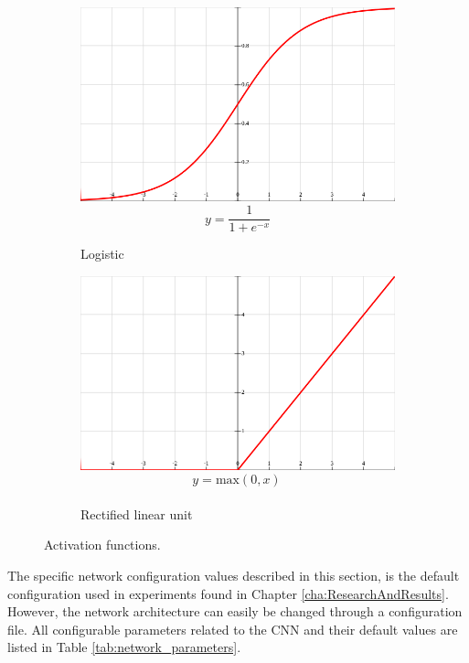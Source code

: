 \begin{figure}[h]
\begin{subfigure}{0.45\textwidth}
\includegraphics[width=\linewidth]{figs/sigmoid2.png}
$$ y = \frac{1}{1+ e^{-x}}$$
\caption{Logistic} \label{fig:activation_sigmoid}
\end{subfigure}
\hspace*{\fill} %
\begin{subfigure}{0.45\textwidth}
\includegraphics[width=\linewidth]{figs/relu2.png}
$$ y = \text{max}(0, x) \frac{}{}$$
\caption{Rectified linear unit} \label{fig:activation_relu}
\end{subfigure}
\hspace*{\fill} %
\caption{Activation functions.} \label{fig:activation_functions}
\end{figure}


The specific network configuration values described in this section, is the default configuration used in experiments found in Chapter \ref{cha:ResearchAndResults}. However, the network architecture can easily be changed through a configuration file. All configurable parameters related to the \ac{CNN} and their default values are listed in Table \ref{tab:network_parameters}.\\

